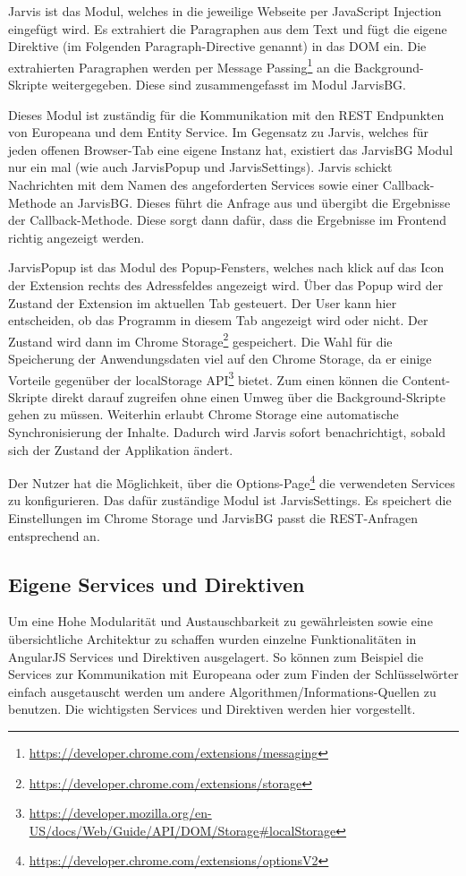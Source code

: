  Jarvis ist das Modul, welches in die jeweilige Webseite per JavaScript Injection eingefügt wird. Es extrahiert die Paragraphen aus dem Text und fügt die eigene Direktive (im Folgenden Paragraph-Directive genannt) in das DOM ein. Die extrahierten Paragraphen werden per Message Passing\footnote{\url{https://developer.chrome.com/extensions/messaging}} an die Background-Skripte weitergegeben. Diese sind zusammengefasst im Modul JarvisBG. 

 Dieses Modul ist zuständig für die Kommunikation mit den REST Endpunkten von Europeana und dem Entity Service. Im Gegensatz zu Jarvis, welches für jeden offenen Browser-Tab eine eigene Instanz hat, existiert das JarvisBG Modul nur ein mal (wie auch JarvisPopup und JarvisSettings). Jarvis schickt Nachrichten mit dem Namen des angeforderten Services sowie einer Callback-Methode an JarvisBG. Dieses führt die Anfrage aus und übergibt die Ergebnisse der Callback-Methode. Diese sorgt dann dafür, dass die Ergebnisse im Frontend richtig angezeigt werden. 

 JarvisPopup ist das Modul des Popup-Fensters, welches nach klick auf das Icon der Extension rechts des Adressfeldes angezeigt wird. Über das Popup wird der Zustand der Extension im aktuellen Tab gesteuert. Der User kann hier entscheiden, ob das Programm in diesem Tab angezeigt wird oder nicht. Der Zustand wird dann im Chrome Storage\footnote{\url{https://developer.chrome.com/extensions/storage}} gespeichert. Die Wahl für die Speicherung der Anwendungsdaten viel auf den Chrome Storage, da er einige Vorteile gegenüber der localStorage API\footnote{\url{https://developer.mozilla.org/en-US/docs/Web/Guide/API/DOM/Storage\#localStorage}} bietet. Zum einen können die Content-Skripte direkt darauf zugreifen ohne einen Umweg über die Background-Skripte gehen zu müssen. Weiterhin erlaubt Chrome Storage eine automatische Synchronisierung der Inhalte. Dadurch wird Jarvis sofort benachrichtigt, sobald sich der Zustand der Applikation ändert.

 Der Nutzer hat die Möglichkeit, über die Options-Page\footnote{\url{https://developer.chrome.com/extensions/optionsV2}} die verwendeten Services zu konfigurieren. Das dafür zuständige Modul ist JarvisSettings. Es speichert die Einstellungen im Chrome Storage und JarvisBG passt die REST-Anfragen entsprechend an.

 \subsection{Eigene Services und Direktiven}
 Um eine Hohe Modularität und Austauschbarkeit zu gewährleisten sowie eine übersichtliche Architektur zu schaffen wurden einzelne Funktionalitäten in AngularJS Services und Direktiven ausgelagert. So können zum Beispiel die Services zur Kommunikation mit Europeana oder zum Finden der Schlüsselwörter einfach ausgetauscht werden um andere Algorithmen/Informations-Quellen zu benutzen. Die wichtigsten Services und Direktiven werden hier vorgestellt.

